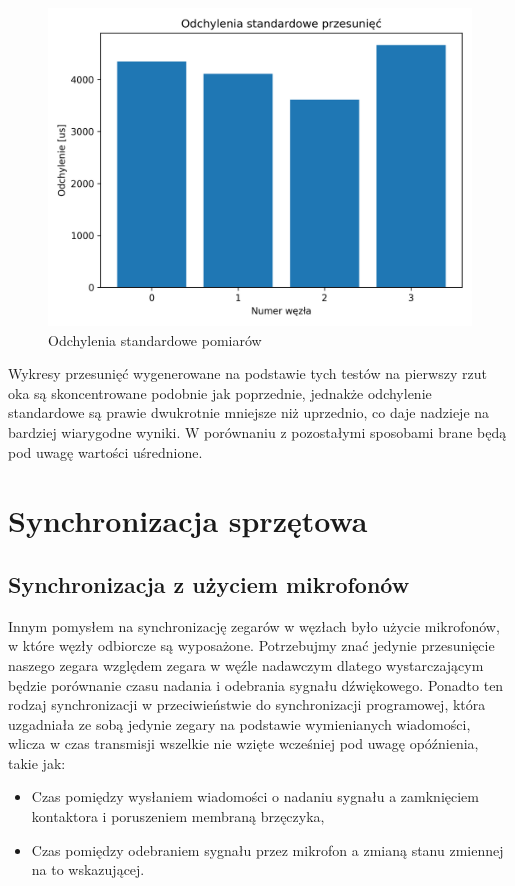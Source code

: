 \begin{figure}[h]
\centering
    \includegraphics[width=.49\textwidth]{pics/time_deltas/stddev.png}
\caption{Odchylenia standardowe pomiarów}
\label{pic:stddev_deltas}
\end{figure}

Wykresy przesunięć wygenerowane na podstawie tych testów na pierwszy rzut oka są skoncentrowane podobnie jak poprzednie, jednakże odchylenie standardowe są prawie dwukrotnie mniejsze niż uprzednio, co daje nadzieje na bardziej wiarygodne wyniki. W porównaniu z pozostałymi sposobami brane będą pod uwagę wartości uśrednione.

\section{Synchronizacja sprzętowa}



\subsection{Synchronizacja z użyciem mikrofonów}\label{sec:mic_sync}

Innym pomysłem na synchronizację zegarów w węzłach było użycie mikrofonów, w które węzły odbiorcze są wyposażone. Potrzebujmy znać jedynie przesunięcie naszego zegara względem zegara w węźle nadawczym dlatego wystarczającym będzie porównanie czasu nadania i odebrania sygnału dźwiękowego. Ponadto ten rodzaj synchronizacji w przeciwieństwie do synchronizacji programowej, która uzgadniała ze sobą jedynie zegary na podstawie wymienianych wiadomości, wlicza w czas transmisji wszelkie nie wzięte wcześniej pod uwagę opóźnienia, takie jak:

\begin{itemize}
    \item Czas pomiędzy wysłaniem wiadomości o nadaniu sygnału a zamknięciem kontaktora i poruszeniem membraną brzęczyka,
    \item Czas pomiędzy odebraniem sygnału przez mikrofon a zmianą stanu zmiennej na to wskazującej.
\end{itemize}


